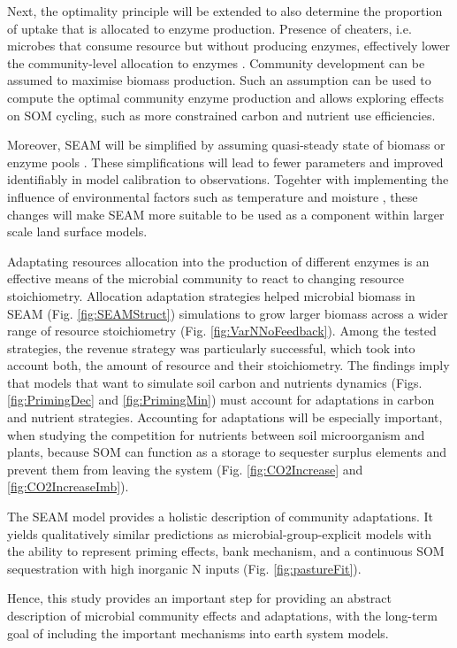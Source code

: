 Next, the optimality principle will be extended to also determine the proportion
of uptake that is allocated to enzyme production. Presence of cheaters, i.e.
microbes that consume resource but without producing enzymes, effectively lower
the community-level allocation to enzymes \citep{Kaiser14}. Community
development can be assumed to maximise biomass production. Such an assumption
can be used to compute the optimal community enzyme production and allows
exploring effects on SOM cycling, such as more constrained carbon and nutrient
use efficiencies.

Moreover, SEAM will be simplified by assuming quasi-steady state of biomass or
enzyme pools \citep{Wutzler13}. These simplifications will lead to fewer
parameters and improved identifiably in model calibration to observations.
Togehter with implementing the influence of environmental factors such as
temperature and moisture \citep{Davidson12}, these changes will make SEAM more
suitable to be used as a component within larger scale land surface models.
 

\conclusions   
 
Adaptating resources allocation into the production of different
enzymes is an effective means of the microbial community to react to changing
resource stoichiometry. Allocation adaptation strategies helped microbial biomass in SEAM
(Fig. \ref{fig:SEAMStruct}) simulations to grow larger biomass across a wider
range of resource stoichiometry (Fig. \ref{fig:VarNNoFeedback}). Among the
tested strategies, the revenue strategy was particularly successful, which took
into account both, the amount of resource and their stoichiometry.
The findings imply that models that want to simulate soil carbon and nutrients
dynamics (Figs. \ref{fig:PrimingDec} and \ref{fig:PrimingMin}) must account for
adaptations in carbon and nutrient strategies. Accounting for adaptations will
be especially important, when studying the competition for nutrients between
soil microorganism and plants, because SOM can function as a storage to
sequester surplus elements and prevent them from leaving the system (Fig.
\ref{fig:CO2Increase} and \ref{fig:CO2IncreaseImb}).

The SEAM model provides a holistic description of community adaptations. It
yields qualitatively similar predictions as microbial-group-explicit models
with the ability to represent priming effects, bank mechanism, and
a continuous SOM sequestration with high inorganic N inputs (Fig.
\ref{fig:pastureFit}).

Hence, this study provides an important step for providing an abstract
description of microbial community effects and adaptations, with the long-term
goal of including the important mechanisms into earth system models.



